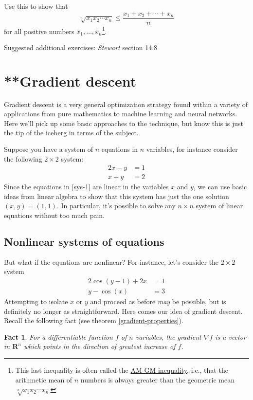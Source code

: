 \documentclass[12pt]{article}
\numberwithin{equation}{subsection}
\numberwithin{figure}{subsection}
\newtheorem{fact}[subsection]{Fact}
\theoremstyle{note}
\begin{document}
{\begin{enumerate}[label=\arabic*.]
Use this to show that \[ \sqrt[n]{x_1x_2\cdots x_n} \leq \dfrac{x_1+x_2+\cdots+x_n}{n} \] for all positive numbers $x_1,\dots, x_n$\footnote{This last inequality is often called the \href{https://en.wikipedia.org/wiki/AM\%E2\%80\%93GM_inequality}{AM-GM inequality}, i.e., that the arithmetic mean of $n$ numbers is always greater than the geometric mean $\sqrt[n]{x_1x_2\cdots x_n}$}.

\end{enumerate}
Suggested additional exercises: \textit{Stewart} section 14.8


\section{**Gradient descent}

Gradient descent is a very general optimization strategy found within a variety of applications from pure mathematics to machine learning and neural networks. Here we'll pick up some basic approaches to the technique, but know this is just the tip of the iceberg in terms of the subject.

Suppose you have a system of $n$ equations in $n$ variables, for instance consider the following $2\times 2$ system:
\begin{align} 2x-y & =1 \nonumber \\
x+y &=2 \label{sys-1} \end{align}
Since the equations in \eqref{sys-1} are linear in the variables $x$ and $y$, we can use basic ideas from linear algebra to show that this system has just the one solution $(x,y)=(1,1)$. In particular, it's possible to solve any $n\times n$ system of linear equations without too much pain.

\subsection{Nonlinear systems of equations}
But what if the equations are nonlinear? For instance, let's consider the $2\times 2$ system 
\begin{align}
2\cos(y-1)+2x&=1 \nonumber \\ y-\cos(x) &=3 \label{sys-2} \end{align}
Attempting to isolate $x$ or $y$ and proceed as before \textit{may} be possible, but is definitely no longer as straightforward. Here comes our idea of gradient descent. Recall the following fact (see theorem \ref{gradient-properties}).

\begin{fact}For a differentiable function $f$ of $n$ variables, the gradient $\nabla f$ is a vector in $\mathbf{R}^n$ which points in the direction of greatest increase of $f$. \end{fact}

}
\end{document}
